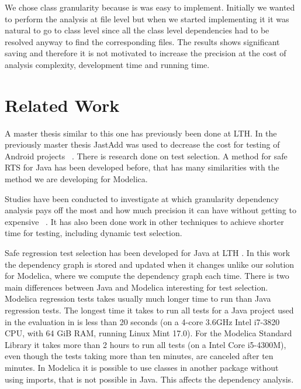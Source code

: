 \documentclass{cslthse-msc}
\begin{document}
We chose class granularity because is was easy to implement. Initially we wanted to perform the analysis at file level but when we started implementing it it was natural to go to class level since all the class level dependencies had to be resolved anyway to find the corresponding files. The results shows significant saving and therefore it is not motivated to increase the precision at the cost of analysis complexity, development time and running time.

\section{Related Work}
A master thesis similar to this one has previously been done at LTH. In the previously master thesis JastAdd was used to decrease the cost for testing of Android projects ~\cite{kampe2012dependroid}. There is research done on test selection. A method for safe RTS for Java has been developed before, that has many similarities with the method we are developing for Modelica. 

Studies have been conducted to investigate at which granularity dependency analysis pays off the most and how much precision it can have without getting to expensive ~\cite{DBLP:conf/sigsoft/LegunsenHSLZM16}. It has also been done work in other techniques to achieve shorter time for testing, including dynamic test selection.

Safe regression test selection has been developed for Java at LTH \cite{DBLP:conf/pppj/OqvistHM16}. In this work the dependency graph is stored and updated when it changes unlike our solution for Modelica, where we compute the dependency graph each time. There is two main differences between Java and Modelica interesting for test selection. Modelica regression tests takes usually much longer time to run than Java regression tests. The longest time it takes to run all tests for a Java project used in the evaluation in \cite{DBLP:conf/pppj/OqvistHM16} is less than 20 seconds (on a 4-core 3.6GHz Intel i7-3820 CPU, with 64 GiB RAM, running Linux Mint 17.0). For the Modelica Standard Library it takes more than 2 hours to run all tests (on a Intel Core i5-4300M), even though the tests taking more than ten minutes, are canceled after ten minutes. In Modelica it is possible to use classes in another package without using imports, that is not possible in Java. This affects the dependency analysis.
\end{document}
